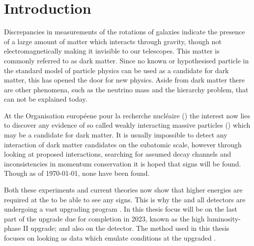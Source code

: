 \chapter{Introduction}\label{cha:intro}
Discrepancies in measurements of the rotations of galaxies indicate the presence of a large amount of matter which interacts through gravity, though not electromagnetically making it invisible to our telescopes. This matter is commonly referred to as dark matter. Since no known or hypothesised particle in the standard model of particle physics can be used as a candidate for dark matter, this has opened the door for new physics. Aside from dark matter there are other phenomena, such as the neutrino mass and the hierarchy problem, that can not be explained today.  

At the Organisation européene pour la recherche nucléaire (\abbrCERN) the interest now lies to discover any evidence of so called weakly interacting massive particles (\abbrWIMPS) which may be a candidate for dark matter. It is usually impossible to detect any interaction of dark matter candidates on the subatomic scale, however through looking at proposed interactions, searching for assumed decay channels and inconsistencies in momentum conservation it is hoped that signs will be found. Though as of \today , none have been found. 

Both these experiments and current theories now show that higher energies are required at the \abbrLHC to be able to see any signs. This is why the \abbrLHC and all detectors are undergoing a vast upgrading program \citep{ATLAS:LOI2}.
In this thesis focus will be on the last part of the upgrade due for completion in 2023, known as the high luminosity-\abbrLHC phase II upgrade; and also on the \abbrATLAS detector. The method used in this thesis focuses on looking as data which emulate conditions at the upgraded \abbrLHC.

\newpage
